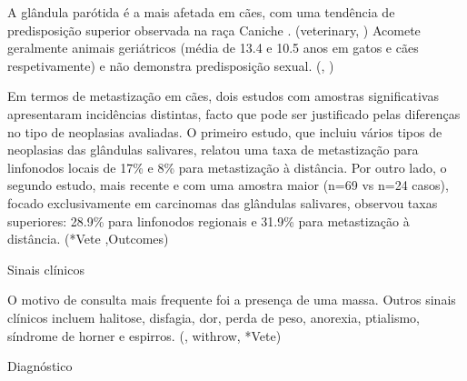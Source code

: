 A glândula parótida é a mais afetada em cães, com uma tendência de predisposição superior  observada na raça Caniche . (veterinary, \cite{Oshikata2006}) Acomete geralmente animais geriátricos (média de 13.4 e 10.5 anos em gatos e cães respetivamente) e não demonstra predisposição sexual. (\cite{Cray2020}, \cite{deLaPuerta2020})


Em termos de metastização em cães, dois estudos com amostras significativas apresentaram incidências distintas, facto que pode ser justificado pelas diferenças no tipo de neoplasias avaliadas. O primeiro estudo, que incluiu vários tipos de neoplasias das glândulas salivares, relatou uma taxa de metastização para linfonodos locais de 17\% e 8\% para metastização à distância. Por outro lado, o segundo estudo, mais recente e com uma amostra maior (n=69 vs n=24 casos), focado exclusivamente em carcinomas das glândulas salivares, observou taxas superiores: 28.9\% para linfonodos regionais e 31.9\% para metastização à distância. (*Vete ,Outcomes)


Sinais clínicos


O motivo de consulta mais frequente foi a presença de uma massa. Outros sinais clínicos incluem halitose, disfagia, dor, perda de peso, anorexia, ptialismo, síndrome de horner e espirros. (\cite{Dobson2011}, withrow, *Vete) 


Diagnóstico


